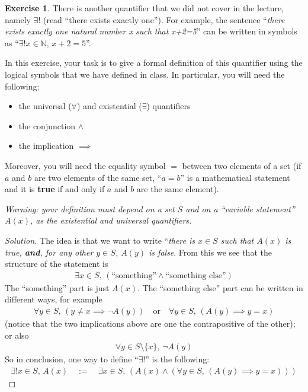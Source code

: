 \documentclass[a4paper,oneside]{article}
\theoremstyle{definition} \newtheorem{exercise}{Exercise}[section]
\begin{document}
\begin{exercise}
  There is another quantifier that we did not cover in the lecture, namely
  $\exists!$ (read ``there exists exactly one''). For example, the sentence
  ``\emph{there exists exactly one natural number x such that x+2=5}'' can be
  written in symbols as ``$\exists!x\in \mathbb N,\,x+2=5$''.

  In this exercise, your task is to give a formal definition of this quantifier
  using the logical symbols that we have defined in class. In particular, you
  will need the following:
  \begin{itemize}
    \item the universal ($\forall$) and existential ($\exists$) quantifiers
    \item the conjunction $\land$
    \item the implication $\implies$
  \end{itemize}
  Moreover, you will need the equality symbol $=$ between two elements of a set
  (if $a$ and $b$ are two elements of the same set, ``$a=b$'' is a mathematical
  statement and it is \textbf{true} if and only if $a$ and $b$ are the same
  element).
  
  \emph{Warning: your definition must depend on a set $S$ and on a ``variable
  statement'' $A(x)$, as the existential and universal quantifiers.}
\end{exercise}
\begin{proof}[Solution]
  The idea is that we want to write ``\emph{there is $x\in S$ such that $A(x)$
  is true, \textbf{and}, for any other $y\in S$, $A(y)$ is false}. From this 
  we see that the structure of the statement is
  \begin{align*}
    \exists x\in S,\,(\text{``something''}\land\text{``something else''})
  \end{align*}
  The ``something'' part is just $A(x)$. The ``something else'' part can be
  written in different ways, for example
  \begin{align*}
    \forall y\in S,\,(y\neq x\implies \neg A(y)) \quad \text{or}
    \quad \forall y\in S,\,(A(y)\implies y=x)
  \end{align*}
  (notice that the two implications above are one the contrapositive of the
  other); or also
  \begin{align*}
    \forall y\in S\setminus \{x\},\, \neg A(y)
  \end{align*}
  So in conclusion, one way to define ``$\exists!$'' is the following:
  \begin{align*}
    \exists!x\in S,\,A(x)\quad:=\quad\exists x\in S,\,(A(x)\land
    (\forall y\in S,\,(A(y)\implies y=x)))
  \end{align*}
    
\end{proof}
\end{document}
